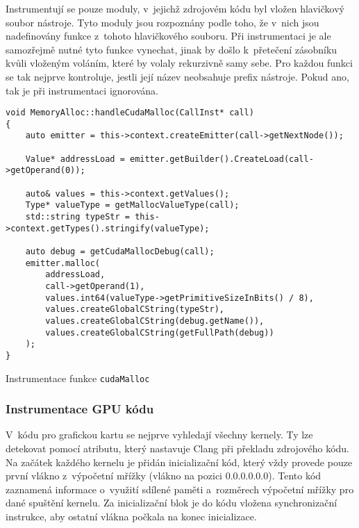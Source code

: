 Instrumentují se pouze moduly, v~jejichž zdrojovém kódu byl vložen hlavičkový soubor nástroje. Tyto moduly jsou rozpoznány podle toho, že v~nich jsou nadefinovány funkce z~tohoto hlavičkového souboru. Při instrumentaci je ale samozřejmě nutné tyto funkce vynechat, jinak by došlo k~přetečení zásobníku kvůli vloženým voláním, které by volaly rekurzivně samy sebe. Pro každou funkci se tak nejprve kontroluje, jestli její název neobsahuje prefix nástroje. Pokud ano, tak je při instrumentaci ignorována.

\begin{listing}
\begin{verbatim}
void MemoryAlloc::handleCudaMalloc(CallInst* call)
{
	auto emitter = this->context.createEmitter(call->getNextNode());
	
	Value* addressLoad = emitter.getBuilder().CreateLoad(call->getOperand(0));
	
	auto& values = this->context.getValues();
	Type* valueType = getMallocValueType(call);
	std::string typeStr = this->context.getTypes().stringify(valueType);

	auto debug = getCudaMallocDebug(call);
	emitter.malloc(
		addressLoad,
		call->getOperand(1),
		values.int64(valueType->getPrimitiveSizeInBits() / 8),
		values.createGlobalCString(typeStr),
		values.createGlobalCString(debug.getName()),
		values.createGlobalCString(getFullPath(debug))
	);
}
\end{verbatim}
\caption{Instrumentace funkce \texttt{cudaMalloc}}
\label{code:cudamallocinstrument}
\end{listing}
 
\subsubsection*{Instrumentace GPU kódu}
V~kódu pro grafickou kartu se nejprve vyhledají všechny kernely. Ty lze detekovat pomocí atributu, který nastavuje Clang při překladu zdrojového kódu. Na začátek každého kernelu je přidán inicializační kód, který vždy provede pouze první vlákno z~výpočetní mřížky (vlákno na pozici $0.0.0.0.0.0$). Tento kód zaznamená informace o~využití sdílené paměti a~rozměrech výpočetní mřížky pro dané spuštění kernelu. Za inicializační blok je do kódu vložena synchronizační instrukce, aby ostatní vlákna počkala na konec inicializace.

